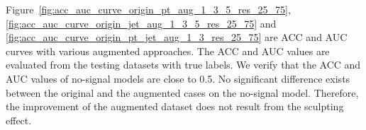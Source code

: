 \documentclass[12pt]{article}
\begin{document}
        Figure~\ref{fig:acc_auc_curve_origin_pt_aug_1_3_5_res_25_75}, \ref{fig:acc_auc_curve_origin_jet_aug_1_3_5_res_25_75} and \ref{fig:acc_auc_curve_origin_pt_jet_aug_1_3_res_25_75} are ACC and AUC curves with various augmented approaches. The ACC and AUC values are evaluated from the testing datasets with true labels. We verify that the ACC and AUC values of no-signal models are close to 0.5. No significant difference exists between the original and the augmented cases on the no-signal model. Therefore, the improvement of the augmented dataset does not result from the sculpting effect.
        \begin{figure}[htpb]
            \centering
             \\
\end{figure}
\end{document}
